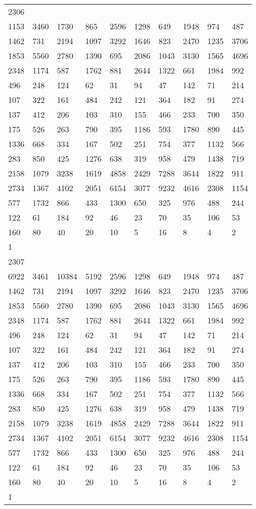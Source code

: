 \begin{longtable}{*{10}{l}}
2306&&&&&&&&&\\
1153& 3460& 1730& 865& 2596& 1298& 649& 1948& 974& 487\\
1462& 731& 2194& 1097& 3292& 1646& 823& 2470& 1235& 3706\\
1853& 5560& 2780& 1390& 695& 2086& 1043& 3130& 1565& 4696\\
2348& 1174& 587& 1762& 881& 2644& 1322& 661& 1984& 992\\
496& 248& 124& 62& 31& 94& 47& 142& 71& 214\\
107& 322& 161& 484& 242& 121& 364& 182& 91& 274\\
137& 412& 206& 103& 310& 155& 466& 233& 700& 350\\
175& 526& 263& 790& 395& 1186& 593& 1780& 890& 445\\
1336& 668& 334& 167& 502& 251& 754& 377& 1132& 566\\
283& 850& 425& 1276& 638& 319& 958& 479& 1438& 719\\
2158& 1079& 3238& 1619& 4858& 2429& 7288& 3644& 1822& 911\\
2734& 1367& 4102& 2051& 6154& 3077& 9232& 4616& 2308& 1154\\
577& 1732& 866& 433& 1300& 650& 325& 976& 488& 244\\
122& 61& 184& 92& 46& 23& 70& 35& 106& 53\\
160& 80& 40& 20& 10& 5& 16& 8& 4& 2\\
1& \\

2307&&&&&&&&&\\
6922& 3461& 10384& 5192& 2596& 1298& 649& 1948& 974& 487\\
1462& 731& 2194& 1097& 3292& 1646& 823& 2470& 1235& 3706\\
1853& 5560& 2780& 1390& 695& 2086& 1043& 3130& 1565& 4696\\
2348& 1174& 587& 1762& 881& 2644& 1322& 661& 1984& 992\\
496& 248& 124& 62& 31& 94& 47& 142& 71& 214\\
107& 322& 161& 484& 242& 121& 364& 182& 91& 274\\
137& 412& 206& 103& 310& 155& 466& 233& 700& 350\\
175& 526& 263& 790& 395& 1186& 593& 1780& 890& 445\\
1336& 668& 334& 167& 502& 251& 754& 377& 1132& 566\\
283& 850& 425& 1276& 638& 319& 958& 479& 1438& 719\\
2158& 1079& 3238& 1619& 4858& 2429& 7288& 3644& 1822& 911\\
2734& 1367& 4102& 2051& 6154& 3077& 9232& 4616& 2308& 1154\\
577& 1732& 866& 433& 1300& 650& 325& 976& 488& 244\\
122& 61& 184& 92& 46& 23& 70& 35& 106& 53\\
160& 80& 40& 20& 10& 5& 16& 8& 4& 2\\
1& \\


\end{longtable}
